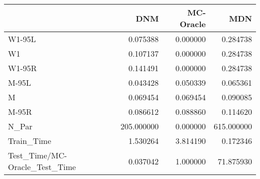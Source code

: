 \begin{tabular}{lrrr}
\toprule
{} &         DNM &  MC-Oracle &         MDN \\
\midrule
W1-95L                        &    0.075388 &   0.000000 &    0.284738 \\
W1                            &    0.107137 &   0.000000 &    0.284738 \\
W1-95R                        &    0.141491 &   0.000000 &    0.284738 \\
M-95L                         &    0.043428 &   0.050339 &    0.065361 \\
M                             &    0.069454 &   0.069454 &    0.090085 \\
M-95R                         &    0.086612 &   0.088860 &    0.114620 \\
N\_Par                         &  205.000000 &   0.000000 &  615.000000 \\
Train\_Time                    &    1.530264 &   3.814190 &    0.172346 \\
Test\_Time/MC-Oracle\_Test\_Time &    0.037042 &   1.000000 &   71.875930 \\
\bottomrule
\end{tabular}

